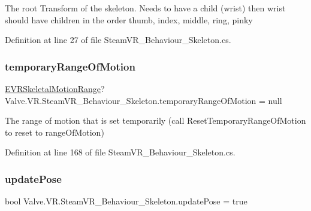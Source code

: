 The root Transform of the skeleton. Needs to have a child (wrist) then wrist should have children in the order thumb, index, middle, ring, pinky 



Definition at line 27 of file Steam\+V\+R\+\_\+\+Behaviour\+\_\+\+Skeleton.\+cs.

\mbox{\label{class_valve_1_1_v_r_1_1_steam_v_r___behaviour___skeleton_a3a59fa3d40d8e23688ea2bcb9e9bbf62}} 
\subsubsection{\texorpdfstring{temporaryRangeOfMotion}{temporaryRangeOfMotion}}
{\footnotesize\ttfamily \mbox{\hyperlink{namespace_valve_1_1_v_r_affc8d18345f8f5d36f1ae7b4ce534500}{E\+V\+R\+Skeletal\+Motion\+Range}}? Valve.\+V\+R.\+Steam\+V\+R\+\_\+\+Behaviour\+\_\+\+Skeleton.\+temporary\+Range\+Of\+Motion = null\hspace{0.3cm}{\ttfamily [protected]}}



The range of motion that is set temporarily (call Reset\+Temporary\+Range\+Of\+Motion to reset to range\+Of\+Motion) 



Definition at line 168 of file Steam\+V\+R\+\_\+\+Behaviour\+\_\+\+Skeleton.\+cs.

\mbox{\label{class_valve_1_1_v_r_1_1_steam_v_r___behaviour___skeleton_af19c499f14c537f57eca2d4186ec4f5e}} 
\subsubsection{\texorpdfstring{updatePose}{updatePose}}
{\footnotesize\ttfamily bool Valve.\+V\+R.\+Steam\+V\+R\+\_\+\+Behaviour\+\_\+\+Skeleton.\+update\+Pose = true}



